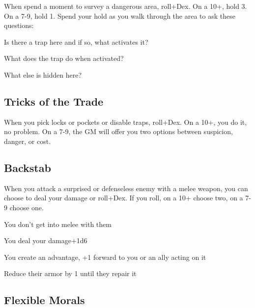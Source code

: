 When spend a moment to survey a dangerous area, roll+Dex. On a 10+, hold 3. On a 7-9, hold 1. Spend your hold as you walk through the area to ask these questions:

           
\startitemize[1,packed]
             
\item Is there a trap here and if so, what activates it?

             
\item What does the trap do when activated?

             
\item What else is hidden here?

           
\stopitemize
           
\subsection{Tricks of the Trade}    
           

When you pick locks or pockets or disable traps, roll+Dex. On a 10+, you do it, no problem. On a 7-9, the GM will offer you two options between suspicion, danger, or cost.

           
\subsection{Backstab}   
           

When you attack a surprised or defenseless enemy with a melee weapon, you can choose to deal your damage or roll+Dex. If you roll, on a 10+ choose two, on a 7-9 choose one.

           
\startitemize[1,packed]
             
\item You don't get into melee with them

             
\item You deal your damage+1d6

             
\item You create an advantage, +1 forward to you or an ally acting on it

             
\item Reduce their armor by 1 until they repair it

           
\stopitemize
           
\subsection{Flexible Morals}    
           

